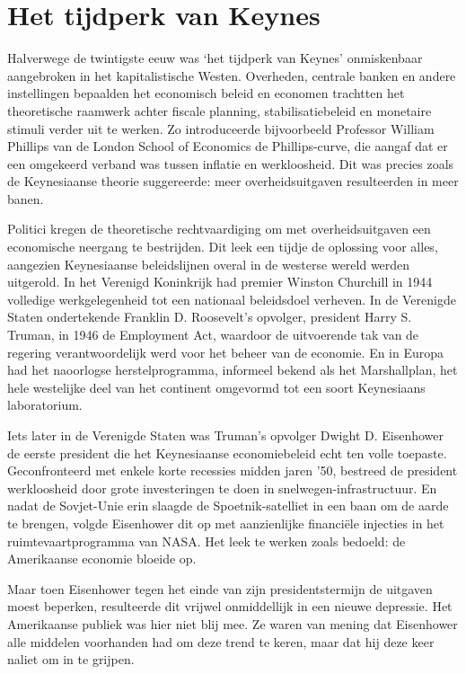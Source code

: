 \documentclass[
  a5paper,
  smalldemyvopaper,11pt,twoside,onecolumn,openright,extrafontsizes]{memoir}
\begin{document}
\section{Het tijdperk van Keynes}\label{het-tijdperk-van-keynes}

Halverwege de twintigste eeuw was `het tijdperk van Keynes' onmiskenbaar
aangebroken in het kapitalistische Westen. Overheden, centrale banken en
andere instellingen bepaalden het economisch beleid en economen
trachtten het theoretische raamwerk achter fiscale planning,
stabilisatiebeleid en monetaire stimuli verder uit te werken. Zo
introduceerde bijvoorbeeld Professor William Phillips van de London
School of Economics de Phillips-curve, die aangaf dat er een omgekeerd
verband was tussen inflatie en werkloosheid. Dit was precies zoals de
Keynesiaanse theorie suggereerde: meer overheidsuitgaven resulteerden in
meer banen.

Politici kregen de theoretische rechtvaardiging om met overheidsuitgaven
een economische neergang te bestrijden. Dit leek een tijdje de oplossing
voor alles, aangezien Keynesiaanse beleidslijnen overal in de westerse
wereld werden uitgerold. In het Verenigd Koninkrijk had premier Winston
Churchill in 1944 volledige werkgelegenheid tot een nationaal
beleidsdoel verheven. In de Verenigde Staten ondertekende Franklin D.
Roosevelt's opvolger, president Harry S. Truman, in 1946 de Employment
Act, waardoor de uitvoerende tak van de regering verantwoordelijk werd
voor het beheer van de economie. En in Europa had het naoorlogse
herstelprogramma, informeel bekend als het Marshallplan, het hele
westelijke deel van het continent omgevormd tot een soort Keynesiaans
laboratorium.

Iets later in de Verenigde Staten was Truman's opvolger Dwight D.
Eisenhower de eerste president die het Keynesiaanse economiebeleid echt
ten volle toepaste. Geconfronteerd met enkele korte recessies midden
jaren '50, bestreed de president werkloosheid door grote investeringen
te doen in snelwegen-infrastructuur. En nadat de Sovjet-Unie erin
slaagde de Spoetnik-satelliet in een baan om de aarde te brengen, volgde
Eisenhower dit op met aanzienlijke financiële injecties in het
ruimtevaartprogramma van NASA. Het leek te werken zoals bedoeld: de
Amerikaanse economie bloeide op.

Maar toen Eisenhower tegen het einde van zijn presidentstermijn de
uitgaven moest beperken, resulteerde dit vrijwel onmiddellijk in een
nieuwe depressie. Het Amerikaanse publiek was hier niet blij mee. Ze
waren van mening dat Eisenhower alle middelen voorhanden had om deze
trend te keren, maar dat hij deze keer naliet om in te grijpen.
\end{document}
